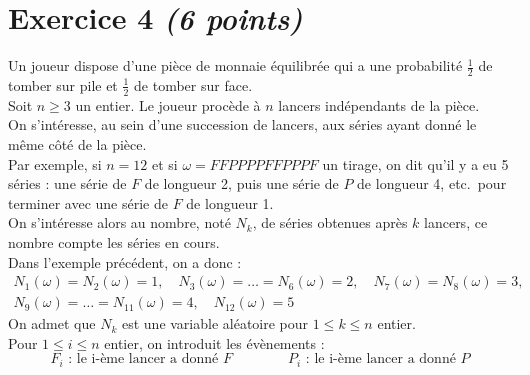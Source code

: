 \section*{Exercice 4 \hfill \normalfont\itshape (6 points)}
Un joueur dispose d'une pièce de monnaie équilibrée qui a une probabilité $\frac{1}{2}$ de tomber sur pile et $\frac{1}{2}$ de tomber sur face.\\
Soit $n\geq 3$ un entier. Le joueur procède à $n$ lancers indépendants de la pièce.\\
On s'intéresse, au sein d'une succession de lancers, aux séries ayant donné le même côté de la pièce. \\
Par exemple, si $n=12$ et si $\omega =FFPPPPFFPPPF$ un tirage, on dit qu'il y a eu 5 séries : une série de $F$ de longueur 2, puis une série de $P$ de longueur 4, etc.\ pour terminer avec une série de $F$ de longueur 1.\\
On s'intéresse alors au nombre, noté $N_k$, de séries obtenues après $k$ lancers, ce nombre compte les séries en cours.\\
Dans l'exemple précédent, on a donc :
\begin{gather*}
N_1(\omega)=N_2(\omega)=1,\quad N_3(\omega)=\dots=N_6(\omega)=2,\quad N_7(\omega)=N_8(\omega)=3,\\
N_9(\omega)=\dots=N_{11}(\omega)=4,\quad N_{12}(\omega)=5
\end{gather*}
On admet que $N_k$ est une variable aléatoire pour $1\leq k\leq n$ entier.\\
Pour $1\leq i\leq n$ entier, on introduit les évènements :
$$F_i \text{ : le i-ème lancer a donné } F \qquad\qquad P_i \text{ : le i-ème lancer a donné } P$$
